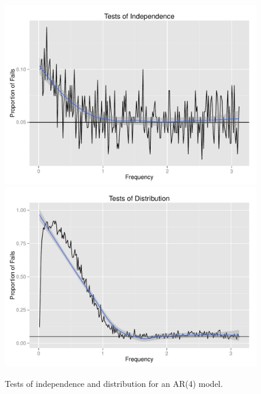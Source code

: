 \documentclass{article}\usepackage{graphicx, color}
\newenvironment{knitrout}{}{} %
\theoremstyle{plain}
\begin{document}
\begin{knitrout}
\color{fgcolor}\begin{figure}[H]

\includegraphics[width=.49\textwidth]{figure/tests-ar41} 
\includegraphics[width=.49\textwidth]{figure/tests-ar42} \caption[Tests of independence and distribution for an AR(4) model]{Tests of independence and distribution for an AR(4) model.\label{fig:tests-ar4}}
\end{figure}


\end{knitrout}
\end{document}
